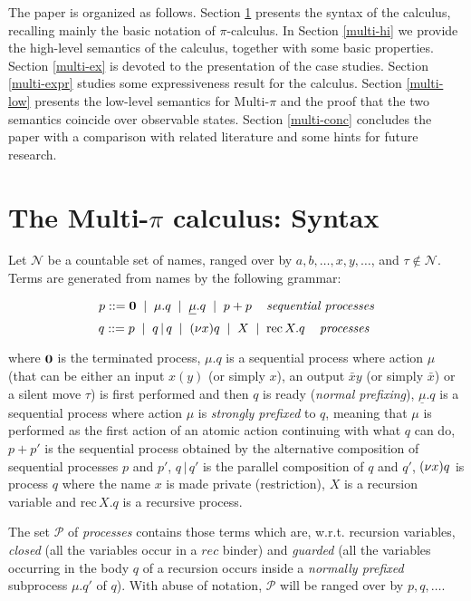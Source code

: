 \documentclass[submission,copyright,creativecommons]{eptcs}
\newcommand{\restr}[1]{\mbox{$({\bf\nu} #1)$}}
\newcommand{\para}{\mbox{$\,|\,$}}
\newcommand{\recx}[1]{\mbox{rec$\, X.#1$}}
\newcommand{\nil}{\mbox{\bf 0}}
\begin{document}
The paper is organized as follows. Section \ref{multi-syntax} presents the syntax of the calculus,
recalling mainly the basic notation of $\pi$-calculus. 
In Section \ref{multi-hi} we provide the high-level semantics of the calculus,
together with some basic properties. 
Section \ref{multi-ex} is devoted to the presentation of the case studies. 
Section \ref{multi-expr} studies some expressiveness result for the calculus.
Section \ref{multi-low} presents
the low-level semantics for Multi-$\pi$ and the proof that the two semantics coincide over observable states.
Section \ref{multi-conc} concludes the paper with a comparison with related literature and some hints for future research.

\section{The Multi-$\pi$ calculus: Syntax} \label{multi-syntax}

Let ${\mathcal N}$ be a countable set of names, ranged over by 
$a,b,\ldots,x,y,\ldots$, and $\tau\not\in{\mathcal N}$.
Terms are generated from names by the following grammar:

\[p ::= \nil \; \mid \; \mu.q \; \mid \;   \underline{\mu}.q \; \mid \;  p+p  \; \; \; \mbox{  {\em sequential processes}}\]
\[q ::= p \; \mid \;  q\para q \; \mid \;  \restr{x}q \; \mid \;  X \; \mid \;  \recx q \; \; \; \mbox{  {\em processes} }\]

\noindent
where $\nil$ is the terminated process, $\mu.q$ is a sequential process where action $\mu$ (that
can be either an input $x(y)$ (or simply $x$), an output  $\bar{x}y$ (or simply $\bar x$) 
or a silent move $\tau$) is first performed and then $q$ is ready
({\em normal prefixing}), 
$ \underline{\mu}.q$  is a sequential process where action $\mu$  is {\em strongly prefixed} to $q$, meaning that 
$\mu$ is performed as the first action of an atomic action continuing with what $q$ can do, 
$p + p'$ is the sequential process obtained by the alternative composition of
sequential processes $p$ and $p'$, $q \para q'$ is the parallel composition 
of $q$ and $q'$, $\restr{x}q$ is process $q$ where the name $x$ is made private (restriction),
$X$ is a recursion variable and $\recx q$ is a recursive process.

The set ${\mathcal P}$ of {\em processes} contains those terms which are, w.r.t. recursion variables,
{\em closed}  (all the variables occur in a $rec$ binder) and {\em guarded} (all the variables occurring 
in the body $q$ of a recursion occurs inside a {\em normally prefixed} subprocess $\mu.q'$ of $q$). 
With abuse of notation, ${\mathcal P}$ will be ranged over by $p, q,\ldots$. 
\end{document}

